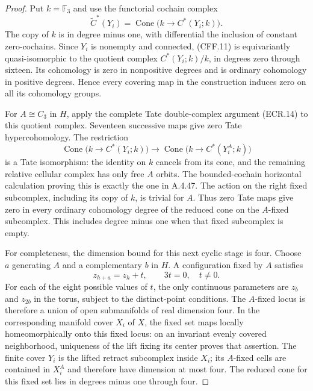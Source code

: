 \begin{proof}
Put $k=\mathbb F_3$ and use the functorial cochain complex
\[
 \widetilde C^*(Y_i)
       =\operatorname{Cone}\bigl(k\longrightarrow C^*(Y_i;k)\bigr).
                                                               \tag{CFF.11}
\]
The copy of $k$ is in degree minus one, with differential the
inclusion of constant zero-cochains.  Since $Y_i$ is nonempty and
connected, (CFF.11) is equivariantly quasi-isomorphic to the
quotient complex $C^*(Y_i;k)/k$, in degrees zero through sixteen.
Its cohomology is zero in nonpositive degrees and is ordinary
cohomology in positive degrees.  Hence every covering map in the
construction induces zero on all its cohomology groups.

For $A\cong C_3$ in $H$, apply the complete Tate double-complex
argument (ECR.14) to this quotient complex.  Seventeen successive
maps give zero Tate hypercohomology.  The restriction
\[
 \operatorname{Cone}\bigl(k\to C^*(Y_i;k)\bigr)
       \longrightarrow
 \operatorname{Cone}\bigl(k\to C^*(Y_i^A;k)\bigr)
                                                               \tag{CFF.12}
\]
is a Tate isomorphism: the identity on $k$ cancels from its cone,
and the remaining relative cellular complex has only free $A$
orbits.  The bounded-cochain horizontal calculation proving this
is exactly the one in A.4.47.  The action on the right fixed
subcomplex, including its copy of $k$, is trivial for $A$.
Thus zero Tate maps give zero in every ordinary cohomology degree
of the reduced cone on the $A$-fixed subcomplex.  This includes
degree minus one when that fixed subcomplex is empty.

For completeness, the dimension bound for this next cyclic stage
is four.  Choose $a$ generating $A$ and a complementary $b$ in $H$.
A configuration fixed by $A$ satisfies
\[
 z_{h+a}=z_h+t,\qquad 3t=0,\quad t\ne0.
                                                               \tag{CFF.13}
\]
For each of the eight possible values of $t$, the only continuous
parameters are $z_b$ and $z_{2b}$ in the torus, subject to the
distinct-point conditions.  The $A$-fixed locus is therefore a
union of open submanifolds of real dimension four.  In the
corresponding manifold cover $X_i$ of $X$, the fixed set maps
locally homeomorphically onto this fixed locus: on an invariant
evenly covered neighborhood, uniqueness of the lift fixing its
center proves that assertion.  The finite cover $Y_i$ is the
lifted retract subcomplex inside $X_i$; its $A$-fixed cells are
contained in $X_i^A$ and therefore have dimension at most four.
The reduced cone
for this fixed set lies in degrees minus one through four.


\end{proof}
